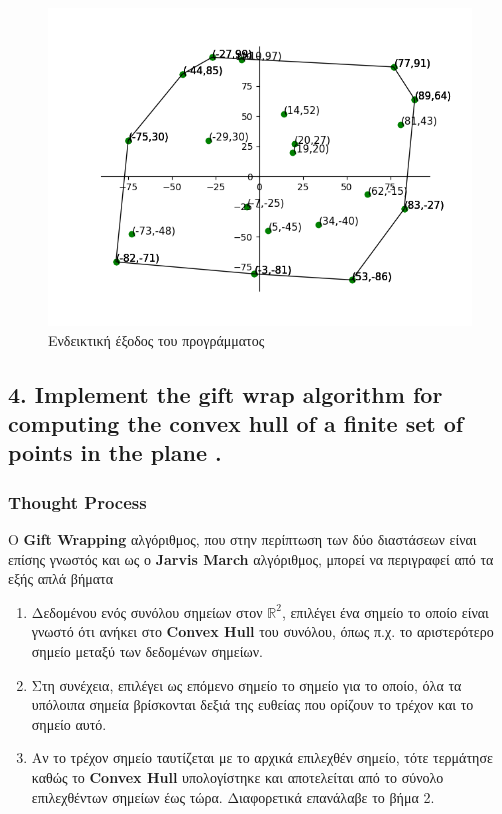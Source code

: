 \documentclass[12pt]{article}
\newcommand{\R}{\mathbb{R}}
\newenvironment{matlab}
	{\begin{figure}[H]\centering\captionsetup{justification=centering}}
	{\end{figure}}
\begin{document}
\begin{matlab}
	\includegraphics[scale=0.7]{images/exercise3_1.png}
	\caption{Ενδεικτική έξοδος του προγράμματος}
\end{matlab}

\pagebreak

\subsection*{4. Implement the gift wrap algorithm for computing the convex hull of a finite
set of points in the plane .}

\subsubsection*{Thought Process}

Ο \textbf{Gift Wrapping} αλγόριθμος, που στην περίπτωση των δύο διαστάσεων είναι
επίσης γνωστός και ως ο \textbf{Jarvis March} αλγόριθμος, μπορεί να περιγραφεί από τα εξής
απλά βήματα \\

\begin{enumerate}
    \item Δεδομένου ενός συνόλου σημείων στον \( \R^2 \),
    επιλέγει ένα σημείο το οποίο είναι γνωστό ότι
    ανήκει στο \textbf{Convex Hull} του συνόλου,
    όπως π.χ. το αριστερότερο σημείο μεταξύ των δεδομένων σημείων.

    \item Στη συνέχεια, επιλέγει ως επόμενο σημείο το σημείο για το οποίο,
    όλα τα υπόλοιπα σημεία βρίσκονται δεξιά της ευθείας που ορίζουν
    το τρέχον και το σημείο αυτό.

    \item Αν το τρέχον σημείο ταυτίζεται με το αρχικά επιλεχθέν σημείο,
    τότε τερμάτησε καθώς το \textbf{Convex Hull} υπολογίστηκε και αποτελείται
    από το σύνολο επιλεχθέντων σημείων έως τώρα. Διαφορετικά επανάλαβε
    το βήμα 2.
\end{enumerate}
\end{document}
